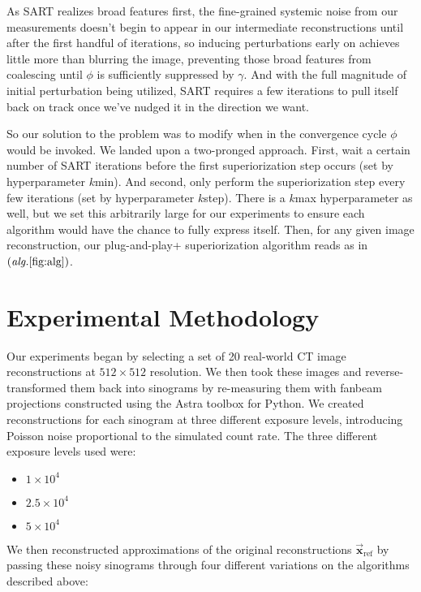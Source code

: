 \documentclass[sigconf,twocolumn,nonacm=true]{acmart}
\newcommand{\tighten}{\vspace*{-6pt plus -2pt minus -2pt}} %
\newcommand{\e}[1]{\times10^{#1}} %
\newcommand{\enc}[1]{\left( #1 \right)} %
\newcommand{\vvec}[1]{\vec{\boldsymbol{#1}}} %
\begin{document}
As SART realizes broad features first, the fine-grained systemic noise from our measurements doesn't begin to appear in our intermediate reconstructions until after the first handful of iterations, so inducing perturbations early on achieves little more than blurring the image, preventing those broad features from coalescing until $\phi$ is sufficiently suppressed by $\gamma$. And with the full magnitude of initial perturbation being utilized, SART requires a few iterations to pull itself back on track once we've nudged it in the direction we want.

So our solution to the problem was to modify when in the convergence cycle $\phi$ would be invoked. We landed upon a two-pronged approach. First, wait a certain number of SART iterations before the first superiorization step occurs (set by hyperparameter $k$min). And second, only perform the superiorization step every few iterations (set by hyperparameter $k$step). There is a $k$max hyperparameter as well, but we set this arbitrarily large for our experiments to ensure each algorithm would have the chance to fully express itself. Then, for any given image reconstruction, our plug-and-play+ superiorization algorithm reads as in $\enc{\textit{alg.}\ref{fig:alg}}$.


\medskip
\section{Experimental Methodology}\tighten
Our experiments began by selecting a set of 20 real-world CT image reconstructions at $512\times512$ resolution. We then took these images and reverse-transformed them back into sinograms by re-measuring them with fanbeam projections constructed using the Astra toolbox\cite{palenstijn2011performance} for Python. We created reconstructions for each sinogram at three different exposure levels, introducing Poisson noise proportional to the simulated count rate. The three different exposure levels used were:

\begin{itemize}
    \item $1\e{4}$
    \item $2.5\e{4}$
    \item $5\e{4}$
\end{itemize}

We then reconstructed approximations of the original reconstructions $\vvec{x}_{\text{ref}}$ by passing these noisy sinograms through four different variations on the algorithms described above:
\end{document}
